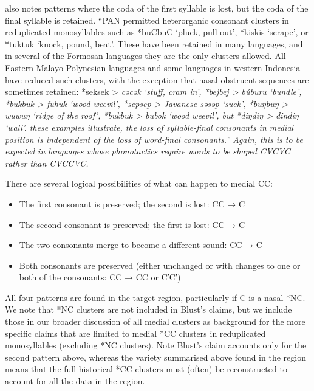 \citet[222]{Blust2013} also notes patterns where the coda of
the first syllable is lost,
but the coda of the final syllable is retained.
“PAN permitted heterorganic consonant clusters in reduplicated
monosyllables such as *buCbuC ‘pluck,
pull out’, *kiskis ‘scrape’,
or *tuktuk ‘knock, pound, beat’.
These have been retained in many languages,
and in several of the Formosan languages they are the only clusters allowed.
All -Eastern Malayo-Polynesian languages
and some languages in western Indonesia have reduced such clusters,
with the exception that nasal-obstruent sequences are sometimes
retained: *seksek >  \it{cəcək} ‘stuff,
cram in’, *bejbej >  \it{búburu} ‘bundle’,
*bukbuk >  \it{fuhuk} ‘wood weevil’,
*sepsep > Javanese \it{səsəp} ‘suck’,
*buŋbuŋ > \it{wuwuŋ} ‘ridge of the roof’,
*bukbuk >  \it{bubok} ‘wood weevil’,
but *diŋdiŋ > \it{dindiŋ} ‘wall’.
 these examples illustrate,
the loss of syllable-final consonants in medial position is independent
of the loss of word-final consonants.” Again,
this is to be expected in languages whose phonotactics require
words to be shaped CVCVC rather than CVCCVC.

There are several logical possibilities of what can happen to
medial CC:

\begin{itemize}
		\item	The first consonant is preserved; the second is lost: CC → C
		\item	The second consonant is preserved; the first is lost: CC\sub{2} → C
		\item	The two consonants merge to become a different sound: CC → C
		\item	Both consonants are preserved
					(either unchanged or with changes to one or both of the consonants:
					C\sub{1}C\sub{2} → CC or C′C′)
\end{itemize}

All four patterns are found in the target region,
particularly if C is a nasal *NC.
We note that *NC clusters are not included in Blust’s claims,
but we include those in our broader discussion of all medial
clusters as background for the more specific claims that are
limited to medial *CC clusters in reduplicated monosyllables (excluding *NC clusters).
Note Blust’s claim accounts only for the second pattern above,
whereas the variety summarised above found in the region means
that the full historical *CC clusters must (often) be reconstructed
to account for all the data in the region.

